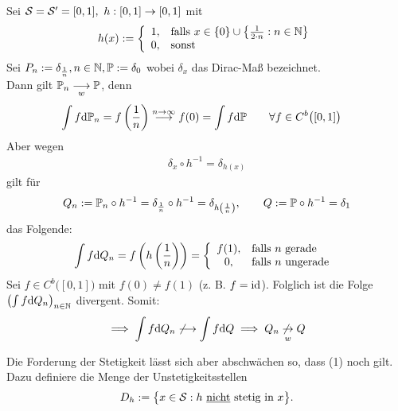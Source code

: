 \begin{beispiel}\label{beisiel4.8}
	Sei $\S=\S'=[0,1],~h:[0,1]\to[0,1]$ mit
	\begin{align*}
		h(x):=\left\lbrace\begin{array}{cl}
			1, &\falls x\in\lbrace 0\rbrace\cup\left\lbrace\frac{1}{2\cdot n}:n\in\N\right\rbrace\\
			0, & \sonst
		\end{array}\right.
	\end{align*}
	Sei $P_n:=\delta_{\frac{1}{n}},n\in\N,\P:=\delta_{0}$ wobei $\delta_x$ das Dirac-Maß bezeichnet.\\
	Dann gilt $\P_n\stackrelnew{w}{}{\longrightarrow} \P$, denn
	\begin{align*}
		\int\limits f\d \P_n&=f\left(\frac{1}{n}\right)\stackrel{n\to\infty}{\longrightarrow} f(0)=\int\limits f\d \P\qquad\forall f\in C^b\big([0,1]\big)
	\end{align*}
	Aber wegen 
	\begin{align*}
		\delta_x\circ h^{-1}=\delta_{h(x)}
	\end{align*}
	gilt für
	\begin{align*}
		Q_n:=\P_n\circ h^{-1}=\delta_{\frac{1}{n}}\circ h^{-1}=\delta_{h\left(\frac{1}{n}\right)},\qquad Q:=\P\circ h^{-1}=\delta_1
	\end{align*}
	das Folgende:
	\begin{align*}
		\int\limits f\d Q_n=f\left(h\left(\frac{1}{n}\right)\right)=\left\lbrace\begin{array}{cl}
			f(1), & \falls n\text{ gerade }\\
			0, & \falls n\text{ ungerade }
		\end{array}\right.
	\end{align*}
	Sei $f\in C^b\big([0,1]\big)$ mit $f(0)\neq f(1)$ (z. B. $f=\id$). 
	Folglich ist die Folge $\left(\int f\d Q_n\right)_{n\in\N}$ divergent. 
	Somit:
	\begin{align*}
		\implies\int\limits f\d Q_n\not\longrightarrow\int\limits f\d Q\implies Q_n\stackrelnew{w}{}{\not\to} Q
	\end{align*}
\end{beispiel}

Die Forderung der Stetigkeit lässt sich aber abschwächen so, dass (1) noch gilt. 
Dazu definiere die Menge der Unstetigkeitsstellen
\begin{align*}
	D_h:=\big\lbrace x\in\S: h\text{ \underline{nicht} stetig in }x\big\rbrace.
\end{align*}

